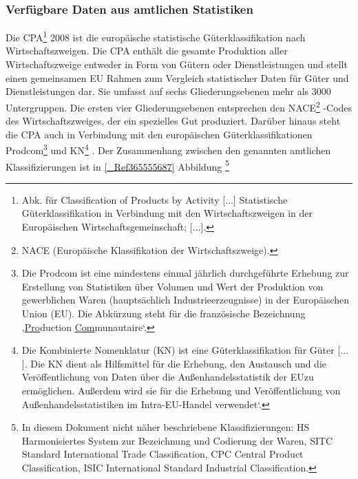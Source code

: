 % 
\subsubsection{Verfügbare Daten aus amtlichen Statistiken}
\label{_Ref365563802}
\label{_Toc366766089}
\label{_Toc366775283}
Die CPA\footnote{%
 \glqq Abk. für Classification of Products by Activity [$\ldots$] Statistische Güterklassifikation in Verbindung mit den Wirtschaftszweigen in der Europäischen Wirtschaftsgemeinschaft; [$\ldots$].
}%
 2008 ist die europäische statistische Güterklassifikation nach Wirtschaftszweigen. Die CPA enthält die gesamte Produktion aller Wirtschaftszweige entweder in Form von Gütern oder Dienstleistungen und stellt einen gemeinsamen EU Rahmen zum Vergleich statistischer Daten für Güter und Dienstleistungen dar. Sie umfasst auf sechs Gliederungsebenen mehr als 3000 Untergruppen. Die ersten vier Gliederungsebenen entsprechen den NACE\footnote{%
 NACE (Europäische Klassifikation der Wirtschaftszweige).
}%
-Codes des Wirtschaftszweiges, der ein spezielles Gut produziert. Darüber hinaus steht die CPA auch in Verbindung mit den europäischen Güterklassifikationen Prodcom\footnote{%
 \glqq Die Prodcom ist eine mindestens einmal jährlich durchgeführte Erhebung zur Erstellung von Statistiken über Volumen und Wert der Produktion von gewerblichen Waren (hauptsächlich Industrieerzeugnisse) in der Europäischen Union (EU). Die Abkürzung steht für die französische Bezeichnung ‚\uline{Pro}duction \uline{Com}munautaire‘.
}%
 und KN\footnote{%
 \glqq Die Kombinierte Nomenklatur (KN) ist eine Güterklassifikation für Güter [$\ldots$]. Die KN dient als Hilfsmittel für die Erhebung, den Austausch und die Veröffentlichung von Daten über die Außenhandelsstatistik der EUzu ermöglichen. Außerdem wird sie für die Erhebung und Veröffentlichung von Außenhandelsstatistiken im Intra-EU-Handel verwendet\grqq  ‘.
}%
. Der Zusammenhang zwischen den genannten amtlichen Klassifizierungen ist in \autoref{_Ref365555687} Abbildung \footnote{%
 In diesem Dokument nicht näher beschriebene Klassifizierungen: HS Harmonisiertes System zur Bezeichnung und Codierung der Waren, SITC Standard International Trade Classification, CPC Central Product Classification, ISIC International Standard Industrial Classification.
}%
